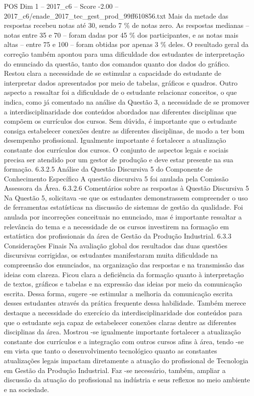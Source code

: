 \begin{textsample}{POS Dim 1 – 2017\_c6 – Score -2.00 – 2017\_c6/enade\_2017\_tec\_gest\_prod\_99ff610856.txt}
Mais da metade das respostas recebeu notas até 30, sendo 7 \% de notas zero.
As respostas medianas – notas entre 35 e 70 – foram dadas por 45 \% dos participantes, e as notas mais altas – entre 75 e 100 – foram obtidas por apenas 3 \% deles.
O resultado geral da correção também apontou para uma dificuldade dos estudantes de interpretação do enunciado da questão, tanto dos comandos quanto dos dados do gráfico.
Restou clara a necessidade de se estimular a capacidade do estudante de interpretar dados apresentados por meio de tabelas, gráficos e quadros.
Outro aspecto a ressaltar foi a dificuldade de o estudante relacionar conceitos, o que indica, como já comentado na análise da Questão 3, a necessidade de se promover a interdisciplinaridade dos conteúdos abordados nas diferentes disciplinas que compõem os currículos dos cursos.
Sem dúvida, é importante que o estudante consiga estabelecer conexões dentre as diferentes disciplinas, de modo a ter bom desempenho profissional.
Igualmente importante é fortalecer a atualização constante dos currículos dos cursos.
O conjunto de aspectos legais e sociais precisa ser atendido por um gestor de produção e deve estar presente na sua formação. 6.3.2.5 Análise da Questão Discursiva 5 do Componente de Conhecimento Específico A questão discursiva 5 foi anulada pela Comissão Assessora da Área. 6.3.2.6 Comentários sobre as respostas à Questão Discursiva 5 Na Questão 5, solicitava -se que os estudantes demonstrassem compreender o uso de ferramentas estatísticas na discussão de sistemas de gestão da qualidade.
Foi anulada por incorreções conceituais no enunciado, mas é importante ressaltar a relevância do tema e a necessidade de os cursos investirem na formação em estatística dos profissionais da área de Gestão da Produção Industrial. 6.3.3 Considerações Finais Na avaliação global dos resultados das duas questões discursivas corrigidas, os estudantes manifestaram muita dificuldade na compreensão dos enunciados, na organização das respostas e na transmissão das ideias com clareza.
Ficou clara a deficiência da formação quanto à interpretação de textos, gráficos e tabelas e na expressão das ideias por meio da comunicação escrita.
Dessa forma, sugere -se estimular a melhoria da comunicação escrita desses estudantes através da prática frequente dessa habilidade.
Também merece destaque a necessidade do exercício da interdisciplinaridade dos conteúdos para que o estudante seja capaz de estabelecer conexões claras dentre as diferentes disciplinas da área.
Mostrou -se igualmente importante fortalecer a atualização constante dos currículos e a integração com outros cursos afins à área, tendo -se em vista que tanto o desenvolvimento tecnológico quanto as constantes atualizações legais impactam diretamente a atuação do profissional de Tecnologia em Gestão da Produção Industrial.
Faz -se necessário, também, ampliar a discussão da atuação do profissional na indústria e seus reflexos no meio ambiente e na sociedade.

\end{textsample}
